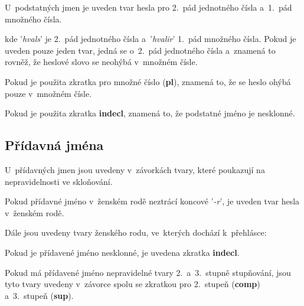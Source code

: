 U~podstatných jmen je uveden tvar hesla pro 2.~pád jednotného čísla a~1.~pád množného čísla.

\blspace
  \dicEntry {}  
\blspace

kde '\textit{hvals}' je 2.~pád jednotného čísla a~'\textit{hvalir}' 1.~pád množného čísla.
Pokud je uveden pouze jeden tvar, jedná se o~2.~pád jednotného čísla a~znamená to rovněž, že heslové slovo se neohýbá v~množném čísle.

\blspace
  \dicEntry {}  
\blspace

Pokud je použita zkratka pro množné číslo (\textbf{pl}), znamená to, že se heslo ohýbá pouze v~množném čísle.

\blspace
  \dicEntry {}  
\blspace

Pokud je použita zkratka \textbf{indecl}, znamená to, že podstatné jméno je nesklonné.

\blspace
  \dicEntry {}  
\blspace

\subsection*{Přídavná jména}

U~přídavných jmen jsou uvedeny v~závorkách tvary, které poukazují na nepravidelnosti ve skloňování.

Pokud přídavné jméno v~ženském rodě neztrácí koncové '\textit{-r}', je uveden tvar hesla v~ženském rodě.

\blspace
  \dicEntry {}  
\blspace

Dále jsou uvedeny tvary ženského rodu, ve~kterých dochází k~přehlásce:

\blspace
  \dicEntry {}  
\blspace

Pokud je přídavené jméno nesklonné, je uvedena zkratka \textbf{indecl}.

\blspace
  \dicEntry {}  
\blspace

Pokud má přídavené jméno nepravidelné tvary 2.~a~3.~stupně stupňování, jsou tyto tvary uvedeny v~závorce spolu se zkratkou pro 2.~stupeň (\textbf{comp}) a~3.~stupeň (\textbf{sup}).

\blspace
  \dicEntry {}  
\blspace

